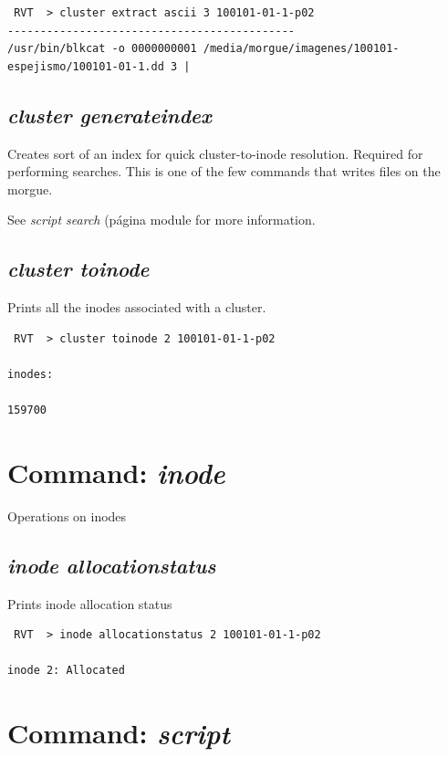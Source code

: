 \documentclass[a4paper,11pt,oneside]{report}
\begin{document}
\begin{verbatim}
 RVT  > cluster extract ascii 3 100101-01-1-p02                                     
--------------------------------------------
/usr/bin/blkcat -o 0000000001 /media/morgue/imagenes/100101-espejismo/100101-01-1.dd 3 | 
\end{verbatim}


\subsection{\emph{cluster generateindex}}

Creates sort of an index for quick cluster-to-inode resolution. Required for performing searches. This is one of the few commands that writes files on the morgue.

See \emph{script search} (página \pageref{anx:searches} module for more information.


\subsection{\emph{cluster toinode}}

Prints all the inodes associated with a cluster.

\begin{verbatim}
 RVT  > cluster toinode 2 100101-01-1-p02                                     

inodes:

159700
\end{verbatim}



\section{Command: \emph{inode}}

Operations on inodes

\subsection{\emph{inode allocationstatus}}

Prints inode allocation status

\begin{verbatim}
 RVT  > inode allocationstatus 2 100101-01-1-p02

inode 2: Allocated
\end{verbatim}



\section{Command: \emph{script}}
\end{document}
